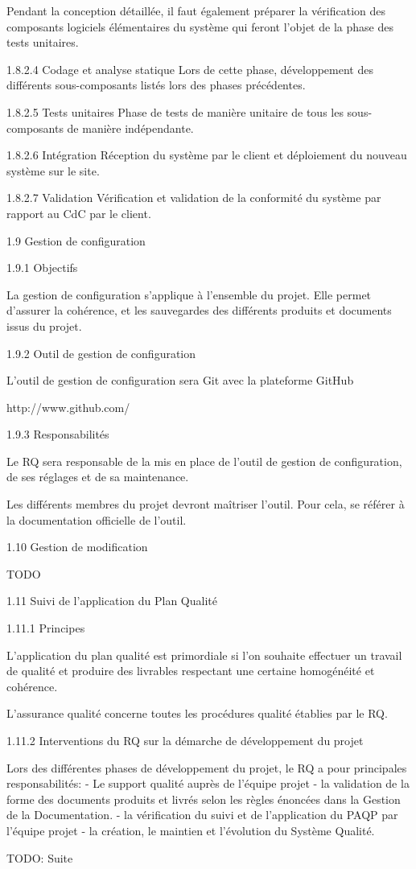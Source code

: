 Pendant la conception détaillée, il faut également préparer la vérification des composants logiciels élémentaires du système qui feront l'objet de la phase des tests unitaires.

1.8.2.4   Codage et analyse statique
Lors de cette phase, développement des différents sous-composants listés lors des phases précédentes.

1.8.2.5   Tests unitaires
Phase de tests de manière unitaire de tous les sous-composants de manière indépendante.

1.8.2.6   Intégration
Réception du système par le client et déploiement du nouveau système sur le site.

1.8.2.7   Validation
Vérification et validation de la conformité du système par rapport au CdC par le client.

1.9   Gestion de configuration

1.9.1   Objectifs

La gestion de configuration s'applique à l'ensemble du projet. Elle permet d'assurer la cohérence, et les sauvegardes des différents produits et documents issus du projet.

1.9.2   Outil de gestion de configuration

L'outil de gestion de configuration sera Git avec la plateforme GitHub

http://www.github.com/

1.9.3   Responsabilités

Le RQ sera responsable de la mis en place de l'outil de gestion de configuration, de ses réglages et de sa maintenance.

Les différents membres du projet devront maîtriser l'outil. Pour cela, se référer à la documentation officielle de l'outil.

1.10   Gestion de modification

TODO

1.11   Suivi de l'application du Plan Qualité

1.11.1   Principes

L'application du plan qualité est primordiale si l'on souhaite effectuer un travail de qualité et produire des livrables respectant une certaine homogénéité et cohérence.

L'assurance qualité concerne toutes les procédures qualité établies par le RQ.

1.11.2   Interventions du RQ sur la démarche de développement du projet

Lors des différentes phases de développement du projet, le RQ a pour principales responsabilités: - Le support qualité auprès de l'équipe projet - la validation de la forme des documents produits et livrés selon les règles énoncées dans la Gestion de la Documentation. - la vérification du suivi et de l'application du PAQP par l'équipe projet - la création, le maintien et l'évolution du Système Qualité.

TODO: Suite
